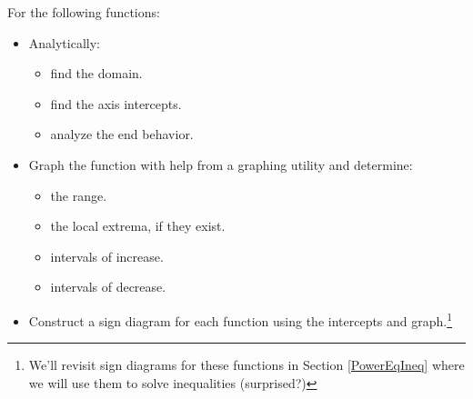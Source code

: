 \documentclass{ximera}
\begin{document}
\begin{ex}  \label{rootradicalfcnex} For the following functions:

\begin{itemize}

\item Analytically:

\begin{multicols}{3}

\begin{itemize}

\item find the domain.

\item find the axis intercepts.

\item analyze the end behavior.

\end{itemize}

\end{multicols}

\newpage

\item Graph the function with help from a graphing utility and determine:

\begin{multicols}{2}

\begin{itemize}

\item  the range.

\item the local extrema, if they exist.

\end{itemize}

\end{multicols}

\begin{multicols}{2}

\begin{itemize}

\item intervals of increase.

\item intervals of decrease.

\end{itemize}

\end{multicols}

\item Construct a sign diagram for each function using the intercepts and graph.\footnote{We'll revisit sign diagrams for these functions in Section \ref{PowerEqIneq} where we will use them to solve inequalities (surprised?)}


\end{itemize}
\end{ex}
\end{document}
